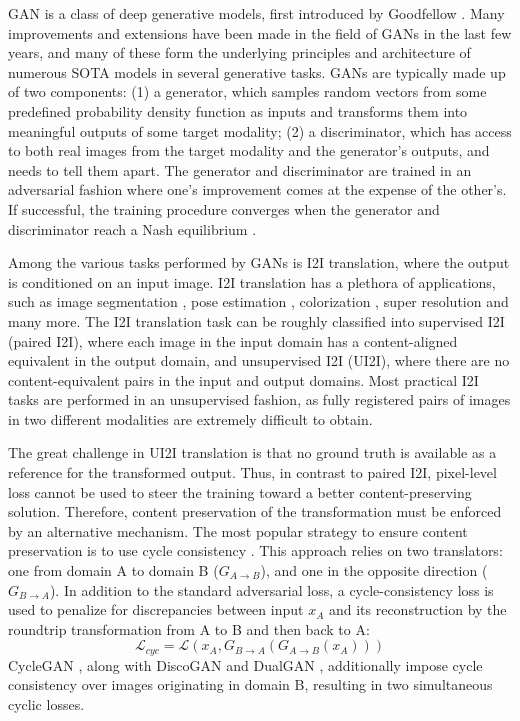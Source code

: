 GAN is a class of deep generative models, first introduced by Goodfellow \etal \cite{goodfellow2014generative}.
Many improvements and extensions have been made in the field of GANs in the last few years, and many of these form the underlying principles and architecture of numerous SOTA models in several generative tasks.
GANs are typically made up of two components: 
(1) a generator, which samples random vectors from some predefined probability density function as inputs and transforms them into meaningful outputs of some target modality; 
(2) a discriminator, which has access to both real images from the target modality and the generator's outputs, and needs to tell them apart.
The generator and discriminator are trained in an adversarial fashion where one's improvement comes at the expense of the other's. 
If successful, the training procedure converges when the generator and discriminator reach a Nash equilibrium \cite{goodfellow2014generative}.

Among the various tasks performed by GANs is I2I translation, where the output is conditioned on an input image.
I2I translation has a plethora of applications, such as image segmentation \cite{yang2018mri, li2020simplified}, pose estimation \cite{li2020manigan, fish2017adversarial}, colorization \cite{isola2017image, suarez2017infrared, zhang2017real}, super resolution \cite{yuan2018unsupervised, zhang2019multiple} and many more.
The I2I translation task can be roughly classified into supervised I2I (paired I2I), where each image in the input domain has a content-aligned equivalent in the output domain, and unsupervised I2I (UI2I), where there are no content-equivalent pairs in the input and output domains.
Most practical I2I tasks are performed in an unsupervised fashion, as fully registered pairs of images in two different modalities are extremely difficult to obtain.

The great challenge in UI2I translation is that no ground truth is available as a reference for the transformed output.
Thus, in contrast to paired I2I, pixel-level loss cannot be used to steer the training toward a better content-preserving solution.
Therefore, content preservation of the transformation must be enforced by an alternative mechanism.
The most popular strategy to ensure content preservation is to use cycle consistency \cite{Lee_2018_ECCV}.
This approach relies on two translators: one from domain A to domain B ($G_{A \rightarrow B}$), and one in the opposite direction ($G_{B \rightarrow A}$). 
In addition to the standard adversarial loss, a cycle-consistency loss is used to penalize for discrepancies between input $x_A$ and its reconstruction by the roundtrip transformation from A to B and then back to A:
\begin{equation}
    \mathcal{L}_{cyc} = \mathcal{L}\left( x_A, G_{B \rightarrow A} \left( G_{A \rightarrow B}(x_A) \right) \right)
\end{equation}
CycleGAN \cite{CycleGAN2017}, along with DiscoGAN \cite{kim2017learning} and DualGAN \cite{yi2017dualgan}, additionally impose cycle consistency over images originating in domain B, resulting in two simultaneous cyclic losses.

